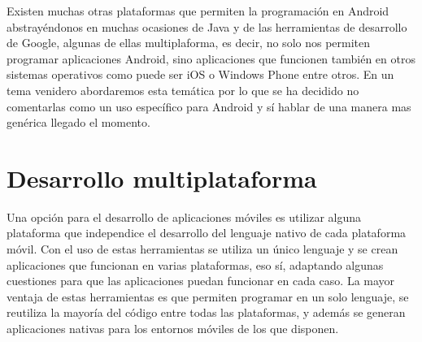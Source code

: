 \documentclass[
10pt, %
a4paper, %
oneside, %
headinclude,footinclude, %
BCOR5mm, %
]{scrartcl}
\begin{document}
Existen muchas otras plataformas que permiten la programación en Android abstrayéndonos en muchas ocasiones de Java y de las herramientas de desarrollo de Google, algunas de ellas multiplaforma, es decir, no solo nos permiten programar aplicaciones Android, sino aplicaciones que funcionen también en otros sistemas operativos como puede ser iOS o Windows Phone entre otros. En un tema venidero abordaremos esta temática por lo que se ha decidido no comentarlas como un uso específico para Android y sí hablar de una manera mas genérica llegado el momento.


\section{Desarrollo multiplataforma}
Una opción para el desarrollo de aplicaciones móviles es utilizar alguna plataforma que independice el desarrollo del lenguaje nativo de cada plataforma móvil. Con el uso de estas herramientas se utiliza un único lenguaje y se crean aplicaciones que funcionan en varias plataformas, eso sí, adaptando algunas cuestiones para que las aplicaciones puedan funcionar en cada caso. La mayor ventaja de estas herramientas es que permiten programar en un solo lenguaje, se reutiliza la mayoría del código entre todas las plataformas, y además se generan aplicaciones nativas para los entornos móviles de los que disponen.
\end{document}
